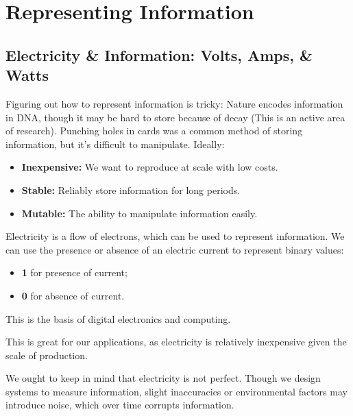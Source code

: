 \section{Representing Information}

\subsection{Electricity \& Information: Volts, Amps, \& Watts}
\label{sec:info}

\noindent
Figuring out how to represent information is tricky: Nature encodes information in DNA, though 
it may be hard to store because of decay (This is an active area of research). Punching holes 
in cards was a common method of storing information, but it's difficult to manipulate. Ideally:
\begin{itemize}
    \item \textbf{Inexpensive:} We want to reproduce at scale with low costs.
    \item \textbf{Stable:} Reliably store information for long periods.
    \item \textbf{Mutable:} The ability to manipulate information easily.
\end{itemize}

\begin{Def}

    \label{def:elec_info}

    Electricity is a flow of electrons, which can be used to represent information. 
    We can use the presence or absence of an electric current to represent binary values:
    \begin{itemize}
        \item \textbf{1} for presence of current;
        \item \textbf{0} for absence of current.
    \end{itemize}
    \noindent
    This is the basis of digital electronics and computing.
\end{Def}
\noindent
This is great for our applications, as electricity is relatively inexpensive given the scale of production.

\begin{theo}

    \label{theo:noise}

    We ought to keep in mind that electricity is not perfect. Though we design systems to measure information,
    slight inaccuracies or environmental factors may introduce noise, which over time corrupts information.
\end{theo}


